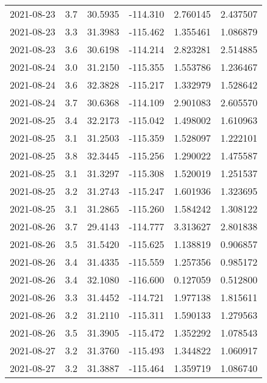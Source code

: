 \begin{tabular}{lrrrrr}
2021-08-23 &       3.7 &  30.5935 &  -114.310 &         2.760145 &         2.437507 \\
2021-08-23 &       3.3 &  31.3983 &  -115.462 &         1.355461 &         1.086879 \\
2021-08-23 &       3.6 &  30.6198 &  -114.214 &         2.823281 &         2.514885 \\
2021-08-24 &       3.0 &  31.2150 &  -115.355 &         1.553786 &         1.236467 \\
2021-08-24 &       3.6 &  32.3828 &  -115.217 &         1.332979 &         1.528642 \\
2021-08-24 &       3.7 &  30.6368 &  -114.109 &         2.901083 &         2.605570 \\
2021-08-25 &       3.4 &  32.2173 &  -115.042 &         1.498002 &         1.610963 \\
2021-08-25 &       3.1 &  31.2503 &  -115.359 &         1.528097 &         1.222101 \\
2021-08-25 &       3.8 &  32.3445 &  -115.256 &         1.290022 &         1.475587 \\
2021-08-25 &       3.1 &  31.3297 &  -115.308 &         1.520019 &         1.251537 \\
2021-08-25 &       3.2 &  31.2743 &  -115.247 &         1.601936 &         1.323695 \\
2021-08-25 &       3.1 &  31.2865 &  -115.260 &         1.584242 &         1.308122 \\
2021-08-26 &       3.7 &  29.4143 &  -114.777 &         3.313627 &         2.801838 \\
2021-08-26 &       3.5 &  31.5420 &  -115.625 &         1.138819 &         0.906857 \\
2021-08-26 &       3.4 &  31.4335 &  -115.559 &         1.257356 &         0.985172 \\
2021-08-26 &       3.4 &  32.1080 &  -116.600 &         0.127059 &         0.512800 \\
2021-08-26 &       3.3 &  31.4452 &  -114.721 &         1.977138 &         1.815611 \\
2021-08-26 &       3.2 &  31.2110 &  -115.311 &         1.590133 &         1.279563 \\
2021-08-26 &       3.5 &  31.3905 &  -115.472 &         1.352292 &         1.078543 \\
2021-08-27 &       3.2 &  31.3760 &  -115.493 &         1.344822 &         1.060917 \\
2021-08-27 &       3.2 &  31.3887 &  -115.464 &         1.359719 &         1.086740 \\

\end{tabular}
